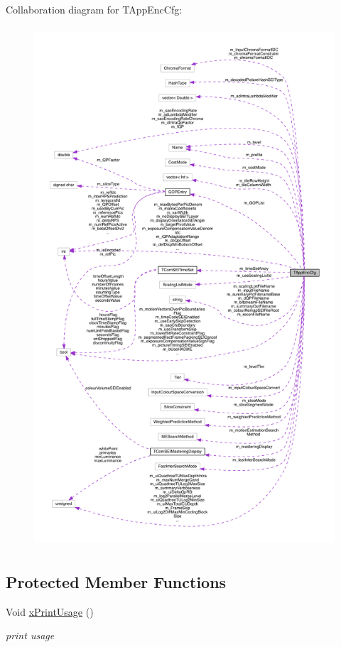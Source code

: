 Collaboration diagram for T\+App\+Enc\+Cfg\+:
\nopagebreak
\begin{figure}[H]
\begin{center}
\leavevmode
\includegraphics[height=550pt]{d9/d13/class_t_app_enc_cfg__coll__graph}
\end{center}
\end{figure}
\subsection*{Protected Member Functions}
\begin{DoxyCompactItemize}
\item 
\mbox{\label{class_t_app_enc_cfg_aad1c0db89f50877796f33521972d8d8e}} 
Void \hyperlink{class_t_app_enc_cfg_aad1c0db89f50877796f33521972d8d8e}{x\+Print\+Usage} ()
\begin{DoxyCompactList}\small\item\em print usage \end{DoxyCompactList}\end{DoxyCompactItemize}
